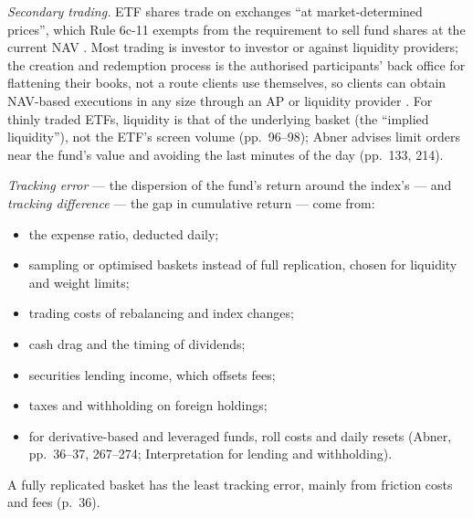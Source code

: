 \begin{qfmethod}\label{meth:etf-trading-tracking-premiums}
 \emph{Secondary trading.} ETF shares trade on exchanges ``at market-determined prices'', which Rule 6c-11 exempts from the requirement to sell fund shares at the current NAV \citep[paras.~(a)(1), (b)(2)]{sec-rule-6c-11}. Most trading is investor to investor or against liquidity providers; the creation and redemption process is the authorised participants' back office for flattening their books, not a route clients use themselves, so clients can obtain NAV-based executions in any size through an AP or liquidity provider \citep[pp.~141--142]{abner-etf-handbook-2016}. For thinly traded ETFs, liquidity is that of the underlying basket (the ``implied liquidity''), not the ETF's screen volume (pp.~96--98); Abner advises limit orders near the fund's value and avoiding the last minutes of the day (pp.~133, 214).

\emph{Tracking error} --- the dispersion of the fund's return around the index's --- and \emph{tracking difference} --- the gap in cumulative return --- come from:
\begin{itemize}
\item the expense ratio, deducted daily;
\item sampling or optimised baskets instead of full replication, chosen for liquidity and weight limits;
\item trading costs of rebalancing and index changes;
\item cash drag and the timing of dividends;
\item securities lending income, which offsets fees;
\item taxes and withholding on foreign holdings;
\item for derivative-based and leveraged funds, roll costs and daily resets (Abner, pp.~36--37, 267--274; Interpretation for lending and withholding).
\end{itemize}
A fully replicated basket has the least tracking error, mainly from friction costs and fees (p.~36).


\end{qfmethod}
